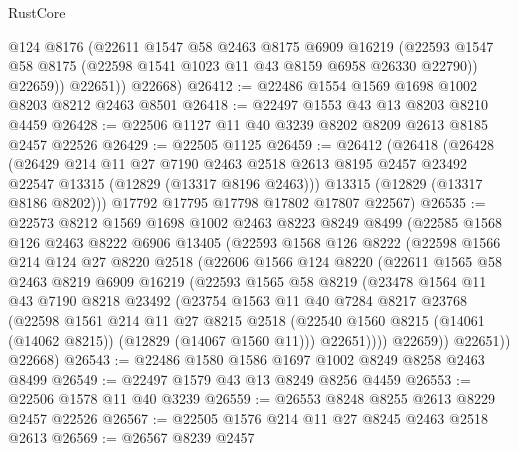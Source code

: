 \begin{lexlean}{RustCore}
\begin{coremodule}
            @124
            @8176
            (@22611
              @1547
              @58
              @2463
              @8175
              @6909
              @16219
              (@22593 @1547 @58 @8175 (@22598 @1541 @1023 @11 @43 @8159 @6958 @26330 @22790))
              @22659))
          @22651))
      @22668)
@26412 := @22486 @1554 @1569 @1698 @1002 @8203 @8212 @2463 @8501
@26418 := @22497 @1553 @43 @13 @8203 @8210 @4459
@26428 := @22506 @1127 @11 @40 @3239 @8202 @8209 @2613 @8185 @2457 @22526
@26429 := @22505 @1125
@26459 := @26412
    (@26418
      (@26428
        (@26429
          @214
          @11
          @27
          @7190
          @2463
          @2518
          @2613
          @8195
          @2457
          @23492
          @22547
          @13315
          (@12829 (@13317 @8196 @2463)))
        @13315
        (@12829 (@13317 @8186 @8202)))
      @17792
      @17795
      @17798
      @17802
      @17807
      @22567)
@26535 := @22573
    @8212
    @1569
    @1698
    @1002
    @2463
    @8223
    @8249
    @8499
    (@22585
      @1568
      @126
      @2463
      @8222
      @6906
      @13405
      (@22593
        @1568
        @126
        @8222
        (@22598
          @1566
          @214
          @124
          @27
          @8220
          @2518
          (@22606
            @1566
            @124
            @8220
            (@22611
              @1565
              @58
              @2463
              @8219
              @6909
              @16219
              (@22593
                @1565
                @58
                @8219
                (@23478
                  @1564
                  @11
                  @43
                  @7190
                  @8218
                  @23492
                  (@23754
                    @1563
                    @11
                    @40
                    @7284
                    @8217
                    @23768
                    (@22598
                      @1561
                      @214
                      @11
                      @27
                      @8215
                      @2518
                      (@22540 @1560 @8215 (@14061 (@14062 @8215)) (@12829 (@14067 @1560 @11)))
                      @22651))))
              @22659))
          @22651))
      @22668)
@26543 := @22486 @1580 @1586 @1697 @1002 @8249 @8258 @2463 @8499
@26549 := @22497 @1579 @43 @13 @8249 @8256 @4459
@26553 := @22506 @1578 @11 @40 @3239
@26559 := @26553 @8248 @8255 @2613 @8229 @2457 @22526
@26567 := @22505 @1576 @214 @11 @27 @8245 @2463 @2518 @2613
@26569 := @26567 @8239 @2457

\end{coremodule}
\end{lexlean}
